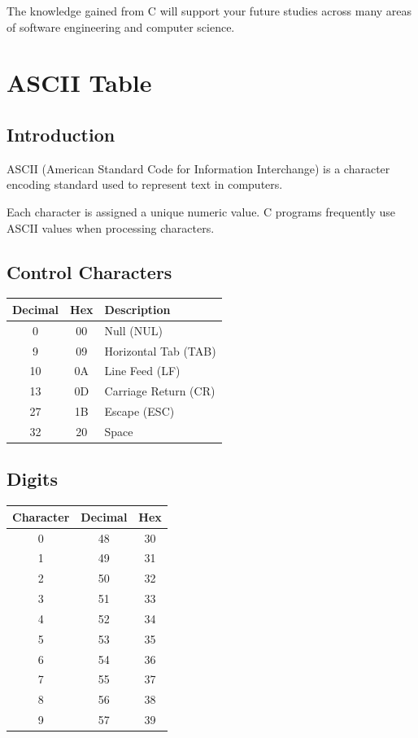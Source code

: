 \documentclass[12pt,openany]{book}
\begin{document}
The knowledge gained from C will support your future studies across many areas of software engineering and computer science.
\appendix

\chapter{ASCII Table}

\section{Introduction}

ASCII (American Standard Code for Information Interchange) is a character encoding standard used to represent text in computers.

Each character is assigned a unique numeric value. C programs frequently use ASCII values when processing characters.

\section{Control Characters}

\begin{center}
\begin{tabular}{|c|c|l|}
\hline
Decimal & Hex & Description \\
\hline
0 & 00 & Null (NUL) \\
9 & 09 & Horizontal Tab (TAB) \\
10 & 0A & Line Feed (LF) \\
13 & 0D & Carriage Return (CR) \\
27 & 1B & Escape (ESC) \\
32 & 20 & Space \\
\hline
\end{tabular}
\end{center}

\section{Digits}

\begin{center}
\begin{tabular}{|c|c|c|}
\hline
Character & Decimal & Hex \\
\hline
0 & 48 & 30 \\
1 & 49 & 31 \\
2 & 50 & 32 \\
3 & 51 & 33 \\
4 & 52 & 34 \\
5 & 53 & 35 \\
6 & 54 & 36 \\
7 & 55 & 37 \\
8 & 56 & 38 \\
9 & 57 & 39 \\
\hline
\end{tabular}
\end{center}
\end{document}
